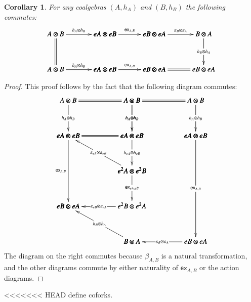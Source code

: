 \documentclass{article}
\newtheorem{corollary}[theorem]{Corollary}
\newcommand{\e}[1]{\mathsf{ex}_{#1}}
\begin{document}
\begin{corollary}
  \label{corollary:ex-simple}
  For any coalgebras $(A,h_A)$ and $(B,h_B)$ the following commutes:
    \[
    \bfig
    \square|aaaa|/->`=``->/<700,500>[
      A \otimes B`
      eA \otimes eB`
      A \otimes B`
      eA \otimes eB;
      h_A \otimes h_B```
      h_A \otimes h_B]

    \square(700,0)|aaaa|/->```->/<700,500>[
      eA \otimes eB`
      eB \otimes eA`
      eA \otimes eB`
      eB \otimes eA;
      \e{A,B}```
      \e{A,B}]

    \square(1400,0)|aama|/->``->`=/<700,500>[
      eB \otimes eA`
      B \otimes A`
      eB \otimes eA`
      eB \otimes eA;
      \varepsilon_B \otimes \varepsilon_A``
      h_B \otimes h_A`]
      \efig
    \]
\end{corollary}
\begin{proof}
  This proof follows by the fact that the following diagram commutes:
  \[
  \bfig
  \square|mmmm|/=`->`->`=/<900,500>[
    A \otimes B`
    A \otimes B`
    eA \otimes eB`
    eA \otimes eB;`
    h_A \otimes h_B`
    h_A \otimes h_B`]

  \qtriangle(0,-500)|mmm|/=`<-`->/<900,500>[
    eA \otimes eB`
    eA \otimes eB`
    e^2A \otimes e^2B;`
    \varepsilon_{eA} \otimes \varepsilon_{eB}`
    h_{eA} \otimes h_{eB}]

  \dtriangle(0,-1000)|mmm|/`->`<-/<900,500>[
    e^2A \otimes e^2B`
    eB \otimes eA`
    e^2B \otimes e^2A;`
    \e{eA,eB}`
    \varepsilon_{eB} \otimes \varepsilon_{eA}]

  \morphism(0,0)<0,-1000>[eA \otimes eB`eB \otimes eA;\e{A,B}]

  \square(900,0)|mmmm|/=`->`->`/<900,500>[
    A \otimes B`
    A \otimes B`
    eA \otimes eB`
    eA \otimes eB;`
    h_A \otimes h_B`
    h_A \otimes h_B`]

  \dtriangle(900,-1500)|mmm|/`->`<-/<900,1500>[
    eA \otimes eB`
    B \otimes A`
    eB \otimes eA;`
    \e{A,B}`
    \varepsilon_{B} \otimes \varepsilon_A]

  \morphism(900,-1500)|m|<-900,500>[B \otimes A`eB \otimes eA;h_B \otimes h_A]
  \efig
  \]
  The diagram on the right commutes because $\beta_{A,B}$ is a natural
  transformation, and the other diagrams commute by either naturality
  of $\e{A,B}$ or the action diagrams.
\end{proof}

<<<<<<< HEAD
define coforks.
\end{document}
